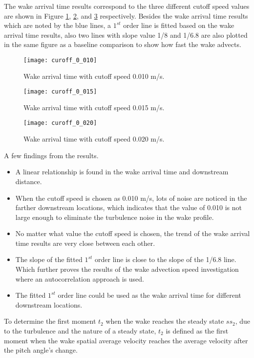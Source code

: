\documentclass{umthesis}
\begin{document}
The wake arrival time results correspond to the three different cutoff speed values are shown in Figure \ref{fig:curoff_0_010}, \ref{fig:curoff_0_015}, and \ref{fig:curoff_0_020} respectively. Besides the wake arrival time results which are noted by the blue lines, a $1^{st}$ order line is fitted based on the wake arrival time results, also two lines with slope value 1/8 and 1/6.8 are also plotted in the same figure as a baseline comparison to show how fast the wake advects.

\begin{figure}
  \centering
  \texttt{[image: curoff\_0\_010]}
  \caption{Wake arrival time with cutoff speed 0.010 m/s.}\label{fig:curoff_0_010}
\end{figure}

\begin{figure}
  \centering
  \texttt{[image: curoff\_0\_015]}
  \caption{Wake arrival time with cutoff speed 0.015 m/s.}\label{fig:curoff_0_015}
\end{figure}

\begin{figure}
  \centering
  \texttt{[image: curoff\_0\_020]}
  \caption{Wake arrival time with cutoff speed 0.020 m/s.}\label{fig:curoff_0_020}
\end{figure}

A few findings from the results.
\begin{itemize}
  \item A linear relationship is found in the wake arrival time and downstream distance.
  \item When the cutoff speed is chosen as 0.010 m/s, lots of noise are noticed in the farther downstream locations, which indicates that the value of 0.010 is not large enough to eliminate the turbulence noise in the wake profile.
  \item No matter what value the cutoff speed is chosen, the trend of the wake arrival time results are very close between each other.
  \item The slope of the fitted $1^{st}$ order line is close to the slope of the 1/6.8 line. Which further proves the results of the wake advection speed investigation where an autocorrelation approach is used.
  \item The fitted $1^{st}$ order line could be used as the wake arrival time for different downstream locations.
\end{itemize}


To determine the first moment $t_2$ when the wake reaches the steady state $ss_2$, due to the turbulence and the nature of a steady state, $t_2$ is defined as the first moment when the wake spatial average velocity reaches the average velocity after the pitch angle’s change.
\end{document}
